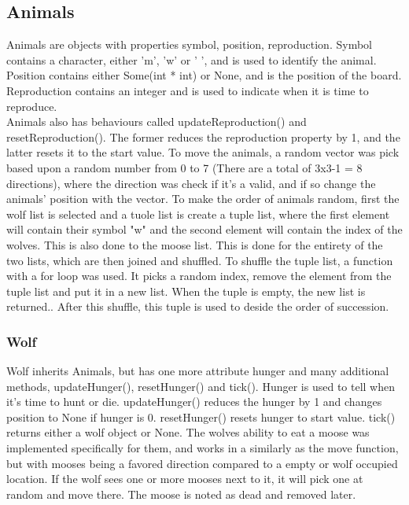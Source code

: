 \documentclass{article}
\begin{document}
    \subsection{Animals}
    Animals are objects with properties symbol, position, reproduction. Symbol contains a character, either 'm', 'w' or ' ', and is used to identify the animal. Position contains either Some(int * int) or None, and is the position of the board. Reproduction contains an integer and is used to indicate when it is time to reproduce.
    \\
    Animals also has behaviours called updateReproduction() and resetReproduction(). The former reduces the reproduction property by 1, and the latter resets it to the start value.
     To move the animals, a random vector was pick based upon a random number from 0 to 7 (There are a total of 3x3-1 = 8 directions), where the direction was check if it's a valid, and if so change the animals' position with the vector.\newline
    To make the order of animals random, first the wolf list is selected and a tuole list is create a tuple list, where the first element will contain their symbol "w" and the second element will contain the index of the wolves. This is also done to the moose list. This is done for the entirety of the two lists, which are then joined and shuffled. \newline To shuffle the tuple list, a function with a for loop was used. It picks a random index, remove the element from the tuple list and put it in a new list. When the tuple is empty, the new list is returned.. After this shuffle, this tuple is used to deside the order of succession. \newline	
    
    \subsubsection{Wolf}
    	Wolf inherits Animals, but has one more attribute hunger and many additional methods, updateHunger(), resetHunger() and tick(). Hunger is used to tell when it's time to hunt or die. updateHunger() reduces the hunger by 1 and changes position to None if hunger is 0. resetHunger() resets hunger to start value. tick() returns either a wolf object or None. 
    The wolves ability to eat a moose was implemented specifically for them, and works in a similarly as the move function, but with mooses being a favored direction compared to a empty or wolf occupied location. If the wolf sees one or more mooses next to it, it will pick one at random and move there. The moose is noted as dead and removed later.  
    
\end{document}
